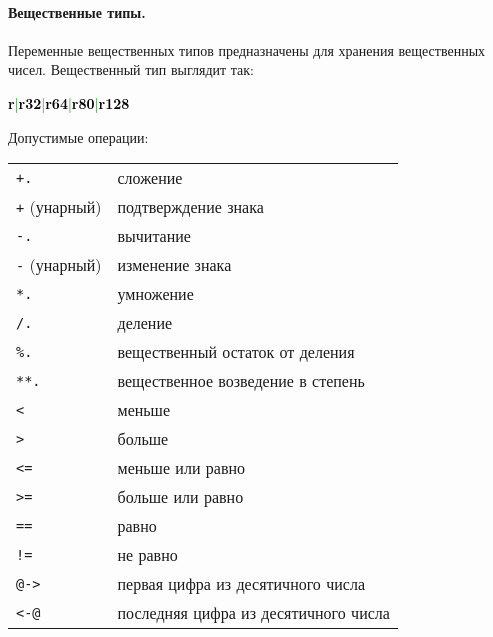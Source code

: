 \documentclass[10pt]{report}
\begin{document}
            \paragraph{Вещественные типы.}Переменные вещественных типов предназначены для хранения вещественных чисел. Вещественный тип выглядит так:
\begin{center}
\noindent\textcolor{Green}{\textcolor{Black}{\textbf{r}}|\textcolor{Black}{\textbf{r32}}|\textcolor{Black}{\textbf{r64}}|\textcolor{Black}{\textbf{r80}}|\textcolor{Black}{\textbf{r128}}}
\end{center}

Допустимые операции:
\begin{longtable}{ll}
\texttt{+.}             & сложение                                          \\
\texttt{+} (унарный)    & подтверждение знака                               \\
\texttt{-.}             & вычитание                                         \\
\texttt{-} (унарный)    & изменение знака                                   \\
\texttt{*.}             & умножение                                         \\
\texttt{/.}             & деление                                           \\
\texttt{\%.}            & вещественный остаток от деления                   \\
\texttt{**.}            & вещественное возведение в степень                 \\
\texttt{<}              & меньше                                            \\
\texttt{>}              & больше                                            \\
\texttt{<=}             & меньше или равно                                  \\
\texttt{>=}             & больше или равно                                  \\
\texttt{==}             & равно                                             \\
\texttt{!=}             & не равно                                          \\
\texttt{@->}             &  первая цифра из десятичного числа                                       \\
\texttt{<-@}             &  последняя цифра из десятичного числа                                \\

\end{longtable}
\end{document}
